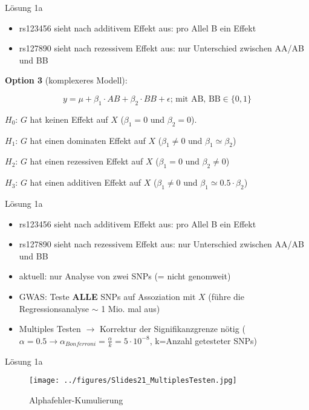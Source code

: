 \documentclass{beamer}
\begin{document}
\begin{frame}{Lösung 1a}
\begin{itemize}
    \item rs123456 sieht nach additivem Effekt aus: pro Allel B ein Effekt
    \item rs127890 sieht nach rezessivem Effekt aus: nur Unterschied zwischen AA/AB und BB
\end{itemize}

\textbf{Option 3} (komplexeres Modell):

$$ y = \mu + \beta_1 \cdot AB + \beta_2 \cdot BB + \epsilon \text{;  mit AB, BB} \in \{0,1\}$$

$H_0$: $G$ hat keinen Effekt auf $X$ ($\beta_1 = 0$ und $\beta_2 = 0$). 

$H_1$: $G$ hat einen dominaten Effekt auf $X$ ($\beta_1 \neq 0$ und $\beta_1 \simeq \beta_2$)

$H_2$: $G$ hat einen rezessiven Effekt auf $X$ ($\beta_1 = 0$ und $\beta_2 \neq 0$)

$H_3$: $G$ hat einen additiven Effekt auf $X$ ($\beta_1 \neq 0$ und $\beta_1 \simeq 0.5 \cdot \beta_2$)

\end{frame}

\begin{frame}{Lösung 1a}
\begin{itemize}
    \item rs123456 sieht nach additivem Effekt aus: pro Allel B ein Effekt
    \item rs127890 sieht nach rezessivem Effekt aus: nur Unterschied zwischen AA/AB und BB
    \item aktuell: nur Analyse von zwei SNPs (= nicht genomweit)
    \item GWAS: Teste \textbf{ALLE} SNPs auf Assoziation mit $X$ (führe die Regressionsanalyse $\sim$ 1 Mio. mal aus)
    \item Multiples Testen $\rightarrow$ Korrektur der Signifikanzgrenze nötig ($\alpha=0.5 \rightarrow \alpha_{Bonferroni} = \frac{\alpha}{k} = 5\cdot 10^{-8}$, k=Anzahl getesteter SNPs)
\end{itemize}
\end{frame}

\begin{frame}{Lösung 1a}
\begin{figure}[h]
\begin{center}
\texttt{[image: ../figures/Slides21\_MultiplesTesten.jpg]}
\caption{Alphafehler-Kumulierung}
\label{fig:MultiplesTesten}
\end{center}
\end{figure}
\end{frame}
\end{document}
